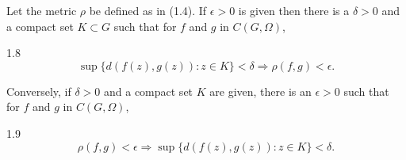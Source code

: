 Let the metric $\rho$ be defined as in (1.4). If $\epsilon > 0$ is given then there is a $\delta > 0$ and a compact set $K \subset G$ such that for $f$ and $g$ in $C(G, \Omega)$,

1.8 $$\sup \{d(f(z), g(z)): z \in K\} < \delta \Rightarrow \rho(f, g) < \epsilon.$$

Conversely, if $\delta > 0$ and a compact set $K$ are given, there is an $\epsilon > 0$ such that for $f$ and $g$ in $C(G, \Omega)$,

1.9 $$\rho(f, g) < \epsilon \Rightarrow \sup \{d(f(z), g(z)): z \in K\} < \delta.$$